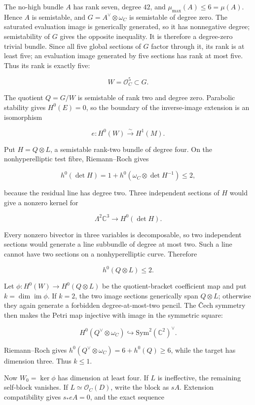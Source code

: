 \documentclass[11pt]{article}
\theoremstyle{definition}
\begin{document}
The no-high bundle \(A\) has rank seven, degree \(42\), and
\(\mu_{\max}(A)\le6=\mu(A)\). Hence \(A\) is semistable, and
\(G=A^\vee\otimes\omega_C\) is semistable of degree zero. The saturated
evaluation image is generically generated, so it has nonnegative degree;
semistability of \(G\) gives the opposite inequality. It is therefore a
degree-zero trivial bundle. Since all five global sections of \(G\)
factor through it, its rank is at least five; an evaluation image
generated by five sections has rank at most five. Thus its rank is
exactly five:

\[W=\mathcal O_C^5\subset G.\]

The quotient \(Q=G/W\) is semistable of rank two and degree zero.
Parabolic stability gives \(H^0(E)=0\), so the boundary of the
inverse-image extension is an isomorphism

\[e:H^0(W)\xrightarrow{\sim}H^1(M).\]

Put \(H=Q\otimes L\), a semistable rank-two bundle of degree four. On
the nonhyperelliptic test fibre, Riemann--Roch gives

\[h^0(\det H)=1+h^0(\omega_C\otimes\det H^{-1})\le2,\]

because the residual line has degree two. Three independent sections of
\(H\) would give a nonzero kernel for

\[\Lambda^2\mathbb C^3\longrightarrow H^0(\det H).\]

Every nonzero bivector in three variables is decomposable, so two
independent sections would generate a line subbundle of degree at most
two. Such a line cannot have two sections on a nonhyperelliptic curve.
Therefore

\[h^0(Q\otimes L)\le2.\]

Let \(\phi:H^0(W)\to H^0(Q\otimes L)\) be the quotient-bracket
coefficient map and put \(k=\dim\operatorname{im}\phi\). If \(k=2\), the
two image sections generically span \(Q\otimes L\); otherwise they again
generate a forbidden degree-at-most-two pencil. The \v{C}ech symmetry then
makes the Petri map injective with image in the symmetric square:

\[H^0(Q^\vee\otimes\omega_C)
\hookrightarrow\mathrm{Sym}^2(\mathbb C^2)^\vee.\]

Riemann--Roch gives \(h^0(Q^\vee\otimes\omega_C)=6+h^0(Q)\ge6\), while
the target has dimension three. Thus \(k\le1\).

Now \(W_0=\ker\phi\) has dimension at least four. If \(L\) is
ineffective, the remaining self-block vanishes. If
\(L\simeq\mathcal O_C(D)\), write the block as \(sA\). Extension
compatibility gives \(s_*eA=0\), and the exact sequence
\end{document}

